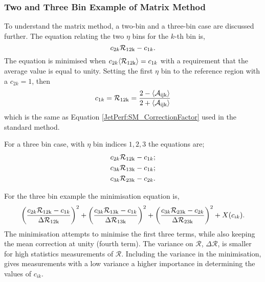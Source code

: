\subsubsection{Two and Three Bin Example of Matrix Method}
To understand the matrix method, a two-bin and a three-bin case are discussed further.
The equation relating the two $\eta$ bins for the $k$-th \ptave{} bin is,  
\begin{equation}
c_{2k}\mathcal{R_{\rm 12k}}- c_{1k}.
\label{JetPerf:Matrix_2binEquations}
\end{equation}
The equation is minimised when $c_{2k}\mbox{$\langle \mathcal{R_{\rm 12k}} \rangle$}= c_{1k}$ with a requirement that the average value is equal to unity.
Setting the first $\eta$ bin to the reference region with a $c_{2k}=1$, then 
\begin{equation}
c_{1k}=\mathcal{R_{\rm 12k}}= \frac{2-\mbox{$\langle \mathcal{A_{\rm ijk}} \rangle$}}{2+\mbox{$\langle \mathcal{A_{\rm ijk}} \rangle$}} 
\label{JetPerf:Matrix_2binEquations}
\end{equation}
which is the same as Equation \ref{JetPerf:SM_CorrectionFactor} used in the standard method.


For a three bin case, with $\eta$ bin indices ${1,2,3}$ the equations are;
\begin{equation}
\begin{split}
c_{2k}\mathcal{R_{\rm 12k}}- c_{1k}; \\
c_{3k}\mathcal{R_{\rm 13k}}- c_{1k}; \\
c_{3k}\mathcal{R_{\rm 23k}}- c_{2k}.
\end{split}
\label{JetPerf:Matrix_3binEquations}
\end{equation}

For the three bin example the minimisation equation is,
\begin{equation}
\left(\frac{c_{2k}\mathcal{R_{\rm 12k}}- c_{1k}}{\Delta\mathcal{R_{\rm 12k}}}\right)^2+
\left(\frac{c_{3k}\mathcal{R_{\rm 13k}}- c_{1k}}{\Delta\mathcal{R_{\rm 13k}}}\right)^2+
\left(\frac{c_{3k}\mathcal{R_{\rm 23k}}- c_{2k}}{\Delta\mathcal{R_{\rm 23k}}}\right)^2+ X(c_{ik}).
\label{JetPerf:Matrix_3binEquations2}
\end{equation}
The minimisation attempts to minimise the first three terms, while also keeping the mean correction at unity (fourth term).
The variance on $\mathcal{R}$, $\Delta\mathcal{R}$, is smaller for high statistics measurements of $\mathcal{R}$.
Including the variance in the minimisation, gives measurements with a low variance a higher importance in determining the values of $c_{ik}$. 

